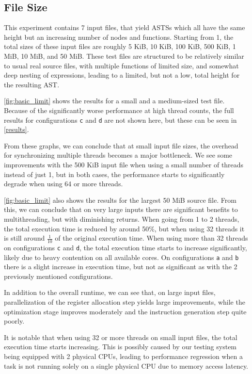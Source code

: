 \documentclass[11pt,dvipsnames]{article}
\newcommand{\mono}[1]{\texttt{#1}}
\begin{document}
\subsection{File Size} \label{filesize}
This experiment contains 7 input files, that yield ASTSs which all have the same height but an increasing number of nodes and functions. Starting from 1, the total sizes of these input files are roughly 5 KiB, 10 KiB, 100 KiB, 500 KiB, 1 MiB, 10 MiB, and 50 MiB. These test files are structured to be relatively similar to usual real source files, with multiple functions of limited size, and somewhat deep nesting of expressions, leading to a limited, but not a low, total height for the resulting AST.

\autoref{fig:basic_limit} shows the results for a small and a medium-sized test file. Because of the significantly worse performance at high thread counts, the full results for configurations \mono{c} and \mono{d} are not shown here, but these can be seen in \autoref{results}.

From these graphs, we can conclude that at small input file sizes, the overhead for synchronizing multiple threads becomes a major bottleneck. We see some improvements with the 500 KiB input file when using a small number of threads instead of just 1, but in both cases, the performance starts to significantly degrade when using 64 or more threads.

\autoref{fig:basic_limit} also shows the results for the largest 50 MiB source file. From this, we can conclude that on very large inputs there are significant benefits to multithreading, but with diminishing returns. When going from 1 to 2 threads, the total execution time is reduced by around 50\%, but when using 32 threads it is still around $\frac{1}{10}$ of the original execution time. When using more than 32 threads on configurations \mono{c} and \mono{d}, the total execution time starts to increase significantly, likely due to heavy contention on all available cores. On configurations \mono{a} and \mono{b} there is a slight increase in execution time, but not as significant as with the 2 previously mentioned configurations.

In addition to the overall runtime, we can see that, on large input files, parallelization of the register allocation step yields large improvements, while the optimization stage improves moderately and the instruction generation step quite poorly.

It is notable that when using 32 or more threads on small input files, the total execution time starts increasing. This is possibly caused by our testing system being equipped with 2 physical CPUs, leading to performance regression when a task is not running solely on a single physical CPU due to memory access latency.
\end{document}
